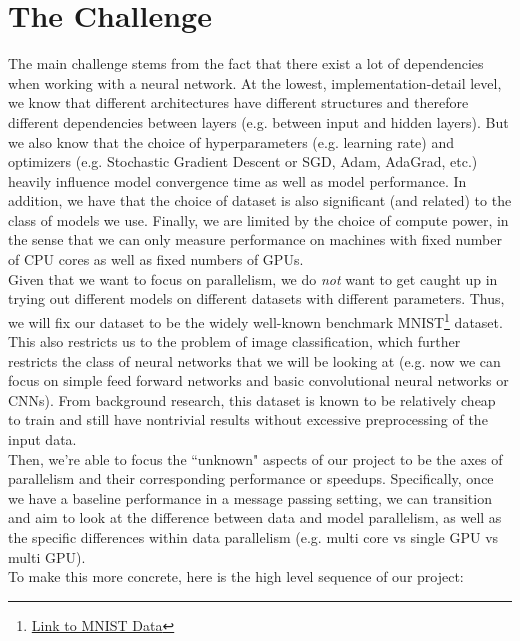 \documentclass{article}
\begin{document}
\section*{The Challenge}

The main challenge stems from the fact that there exist a lot of dependencies when working with a neural network. At the lowest, implementation-detail level, we know that different architectures have different structures and therefore different dependencies between layers (e.g. between input and hidden layers). But we also know that the choice of hyperparameters (e.g. learning rate) and optimizers (e.g. Stochastic Gradient Descent or SGD, Adam, AdaGrad, etc.) heavily influence model convergence time as well as model performance. In addition, we have that the choice of dataset is also significant (and related) to the class of models we use. Finally, we are limited by the choice of compute power, in the sense that we can only measure performance on machines with fixed number of CPU cores as well as fixed numbers of GPUs.\\

Given that we want to focus on parallelism, we do \textit{not} want to get caught up in trying out different models on different datasets with different parameters. Thus, we will fix our dataset to be the widely well-known benchmark MNIST\footnote{\href{http://yann.lecun.com/exdb/mnist/}{Link to MNIST Data}} dataset. This also restricts us to the problem of image classification, which further restricts the class of neural networks that we will be looking at (e.g. now we can focus on simple feed forward networks and basic convolutional neural networks or CNNs). From background research, this dataset is known to be relatively cheap to train and still have nontrivial results without excessive preprocessing of the input data.\\

Then, we're able to focus the ``unknown" aspects of our project to be the axes of parallelism and their corresponding performance or speedups. Specifically, once we have a baseline performance in a message passing setting, we can transition and aim to look at the difference between data and model parallelism, as well as the specific differences within data parallelism (e.g. multi core vs single GPU vs multi GPU). \\

To make this more concrete, here is the high level sequence of our project:
\end{document}
